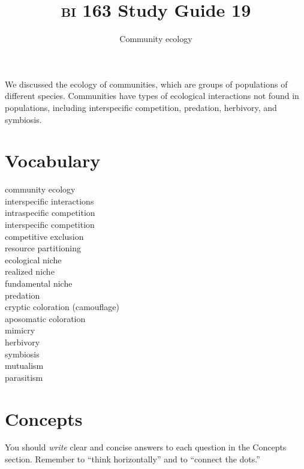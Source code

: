 \documentclass[letterpaper]{tufte-handout}
\title{{\scshape bi} 163 Study Guide 19}
\author{Community ecology}
\date{} %
\begin{document}
\maketitle	%

We discussed the ecology of communities, which are groups of populations of different species.  Communities have types of ecological interactions not found in populations, including interspecific competition, predation, herbivory, and symbiosis.

\section*{Vocabulary}

\vspace{-1\baselineskip}
\begin{multicols}{2}
community ecology\\
interspecific interactions\\
intraspecific competition\\
interspecific competition\\
competitive exclusion\\
resource partitioning\\
ecological niche\\
realized niche\\
fundamental niche\\
predation \\
cryptic coloration (camouflage)\\
aposomatic coloration\\
mimicry\\
herbivory \\
symbiosis\\
mutualism\\
parasitism
\end{multicols}

\section*{Concepts}

You should \emph{write} clear and concise answers to each question in the Concepts section.  Remember to ``think horizontally'' and to ``connect the dots.'' 
\end{document}

